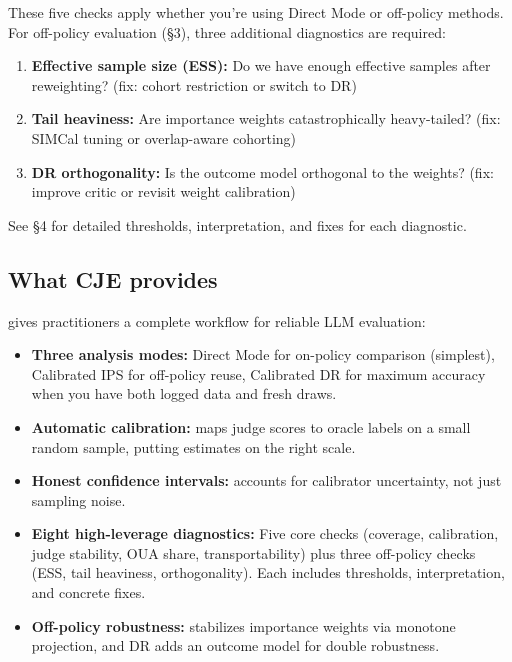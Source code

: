 These five checks apply whether you're using Direct Mode or off-policy methods. For off-policy evaluation (§3), three additional diagnostics are required:

\begin{enumerate}[label=(\alph*),resume]
\item \textbf{Effective sample size (ESS):} Do we have enough effective samples after reweighting? (fix: cohort restriction or switch to DR)

\item \textbf{Tail heaviness:} Are importance weights catastrophically heavy-tailed? (fix: SIMCal tuning or overlap-aware cohorting)

\item \textbf{DR orthogonality:} Is the outcome model orthogonal to the weights? (fix: improve critic or revisit weight calibration)
\end{enumerate}

See §4 for detailed thresholds, interpretation, and fixes for each diagnostic.

\subsection{What CJE provides}

\cje{} gives practitioners a complete workflow for reliable LLM evaluation:

\begin{itemize}
\item \textbf{Three analysis modes:} Direct Mode for on-policy comparison (simplest), Calibrated IPS for off-policy reuse, Calibrated DR for maximum accuracy when you have both logged data and fresh draws.

\item \textbf{Automatic calibration:} \autocal{} maps judge scores to oracle labels on a small random sample, putting estimates on the right scale.

\item \textbf{Honest confidence intervals:} \oua{} accounts for calibrator uncertainty, not just sampling noise.

\item \textbf{Eight high-leverage diagnostics:} Five core checks (coverage, calibration, judge stability, OUA share, transportability) plus three off-policy checks (ESS, tail heaviness, orthogonality). Each includes thresholds, interpretation, and concrete fixes.

\item \textbf{Off-policy robustness:} \simcal{} stabilizes importance weights via monotone projection, and DR adds an outcome model for double robustness.
\end{itemize}

